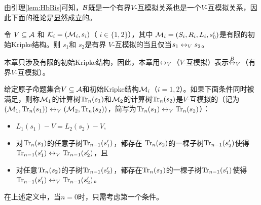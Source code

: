 由引理\ref{lem:HbBis}可知，${\cal B}$既是一个有界$V$-互模拟关系也是一个$V$-互模拟关系，因此下面的推论是显然成立的。
\begin{corollary} \label{lem:bounedToGe}
	令 $V \subseteq {\cal A}$ 和 ${\cal K}_i=({\cal M}_i,s_i)$（ $i\in\{1,2\}$），其中 ${\cal M}_i=(S_i, R_i,L_i, s_0^i)$是有限的初始Kripke结构。则
	$s_1$和 $s_2$是有界 $V$-互模拟的当且仅当$s_1 \leftrightarrow_V s_2$。
\end{corollary}


本章只涉及有限的初始Kripke结构，因此，本章用$\leftrightarrow_V$（$V$-互模拟）表示$\overset{B}{\leftrightarrow}_V $（有界$V$-互模拟）。

给定原子命题集合$V\subseteq {\cal A}$和初始Kripke结构${\cal M}_i$（$i = 1, 2$）。如果下面条件同时被满足，则称${\cal M}_1$的计算树$\textrm{Tr}_n(s_1)$和${\cal M}_2$的计算树$\textrm{Tr}_n(s_2)$是$V$-互模拟的（记为$({\cal M}_1,\textrm{Tr}_n(s_1))\leftrightarrow_V({\cal M}_2,\textrm{Tr}_n(s_2))$，简写为$\textrm{Tr}_n(s_1)\leftrightarrow_V\textrm{Tr}_n(s_2)$）：
\begin{itemize}
	\item $L_1(s_1)- V=L_2(s_2)- V$,
	\item 对$\textrm{Tr}_n(s_1)$的任意子树$\textrm{Tr}_{n-1}(s_1')$，都存在  $\textrm{Tr}_n(s_2)$的一棵子树$\textrm{Tr}_{n-1}(s_2')$使得 
	$\textrm{Tr}_{n-1}(s_1')\leftrightarrow_V\textrm{Tr}_{n-1}(s_2')$，且
	\item 对任意$\textrm{Tr}_n(s_2)$的子树$\textrm{Tr}_{n-1}(s_2')$，都存在$\textrm{Tr}_n(s_1)$的一棵子树$\textrm{Tr}_{n-1}(s_1')$使得
	$\textrm{Tr}_{n-1}(s_1')\leftrightarrow_V\textrm{Tr}_{n-1}(s_2')$。
\end{itemize}

在上述定义中，当$n=0$时，只需考虑第一个条件。

